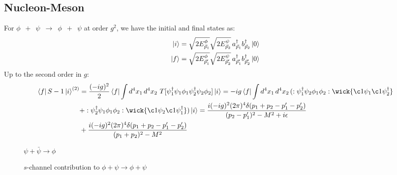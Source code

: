 \documentclass{article}
\newcommand{\vecp}{\vec{p}}
\begin{document}
\subsection*{Nucleon-Meson}
For $\phi \,\,\, + \,\,\, \psi \,\,\,\to\,\,\, \phi \,\,\, + \,\,\, \psi $ at order $g^2$, we have the initial and final states as:
\begin{equation}
    \begin{split}
        \ket{i}&=\sqrt{2E^\phi_{\vecp_1}}\sqrt{2E^\psi_{\vecp_2}} \, a^\dagger_{\vecp_1}b^\dagger_{\vecp_2}\ket{0}\\
        \ket{f}&=\sqrt{2E^\phi_{\vecp_1'}}\sqrt{2E^\psi_{\vecp_2'}} \, a^\dagger_{\vecp_1'}b^\dagger_{\vecp_2'}\ket{0}\\
    \end{split}
\end{equation}
Up to the second order in $g$:
\begin{equation}
    \begin{split}
        \bra{f}S-1\ket{i}^{(2)} &= \frac{(-ig)^2}{2} \bra{f}\int d^4x_1\,d^4x_2\,\,T[\psi_1^\dagger\psi_1\phi_1\psi_2^\dagger\psi_2\phi_2]\ket{i}=-ig \bra{f}\int d^4x_1\,d^4x_2\,(:\psi_1^\dagger\psi_2\phi_1\phi_2:\wick{\c1 \psi_1 \c1 \psi_2^\dagger}\\
        &+:\psi_2^\dagger\psi_1\phi_1\phi_2:\wick{\c1 \psi_2 \c1 \psi_1^\dagger}) \ket{i}= \frac{i (-ig)^2(2\pi)^4\delta(p_1+p_2-p_1'-p_2')}{(p_2-p_1')^2-M^2+i\epsilon}\\
        &+  \frac{i (-ig)^2(2\pi)^4\delta(p_1+p_2-p_1'-p_2')}{(p_1+p_2)^2-M^2}
    \end{split}
\end{equation}
\begin{figure}[h!]
\centering
{}
\caption{\(\psi+\bar\psi\to\phi\)}
\end{figure}

\begin{figure}[h!]
\centering
{}
\caption{\(s\)-channel contribution to \(\phi+\psi\to\phi+\psi\)}
\end{figure}
\end{document}
